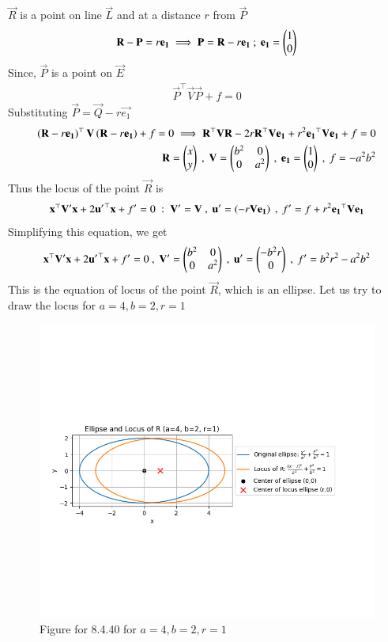 \documentclass[journal,12pt,onecolumn]{IEEEtran}
\theoremstyle{remark}
\begin{document}
$\vec{R}$ is a point on line $\vec{L}$ and at a distance $r$ from $\vec{P}$
\begin{align}
    \mathbf{R} - \mathbf{P}= r\mathbf{e_1} \implies \mathbf{P}=\mathbf{R} - r\mathbf{e_1}\  ; \ \mathbf{e_1}=\begin{pmatrix}1\\0\end{pmatrix}
\end{align}
Since, $\vec{P}$ is a point on $\vec{E}$
\begin{align}
    \vec{P}^{\top}\vec{V}\vec{P} + f=0
\end{align}
Substituting $\vec{P} = \vec{Q} -r\vec{e_1}$
\begin{align}
    \left(\mathbf{R} -r\mathbf{e_1}\right)^{\top}\mathbf{V}\left(\mathbf{R} -r\mathbf{e_1}\right) + f=0 \implies \mathbf{R}^{\top}\mathbf{V}\mathbf{R} - 2r\mathbf{R}^{\top}\mathbf{V}\mathbf{e_1} + r^2\mathbf{e_1}^{\top}\mathbf{V}\mathbf{e_1}+f=0\\
    \mathbf{R}= \begin{pmatrix}x\\y\end{pmatrix} \ , \ \mathbf{V}=\begin{pmatrix}b^2 & 0 \\ 0 & a^2\end{pmatrix} \ , \ \mathbf{e_1}=\begin{pmatrix}1\\0\end{pmatrix} \ , \ f=-a^2b^2
\end{align}
Thus the locus of the point $\vec{R}$ is
\begin{align}
    \mathbf{x}^{\top}\mathbf{V'}\mathbf{x} + 2 \mathbf{u'}^{\top}\mathbf{x} + f'=0 \ : \ \mathbf{V'}=\mathbf{V} \ , \ \mathbf{u'}=\left(-r\mathbf{V}\mathbf{e_1}\right) \ , \ f'=f+ r^2\mathbf{e_1}^{\top}\mathbf{V}\mathbf{e_1}
\end{align}
Simplifying this equation, we get
\begin{align}
 	\vec{x}^{\top}\vec{V'}\vec{x} + 2\vec{u'}^{\top}\vec{x} +f'=0 \ , \ \vec{V'}=\myvec{b^2 & 0\\0&a^2} \ , \ \vec{u'}=\myvec{-b^2r\\0} \ , \  f'=b^2r^2 - a^2b^2
\end{align}
This is the equation of locus of the point $\vec{R}$, which is an ellipse.
Let us try to draw the locus for $a=4, b=2 , r=1 $
\begin{figure}[H]
        \centering
        \includegraphics[width=1\columnwidth]{figs/1.png}
        \caption{Figure for 8.4.40 for $a=4, b=2, r=1$}
        \label{fig:placeholder}
    \end{figure}
\end{document}
